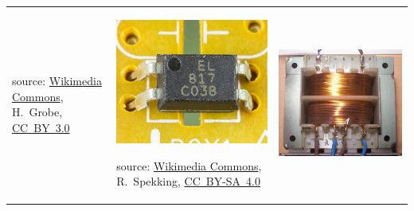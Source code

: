 \begin{frame}
\begin{table}
\begin{tabular}{M{0.3\textwidth} M{0.3\textwidth} M{0.3\textwidth}}
            {\small source: \href{https://commons.wikimedia.org/wiki/File:Plattenkondensator_hg.jpg}{Wikimedia Commons}, H.~Grobe, \href{https://creativecommons.org/licenses/by/3.0/deed.en}{CC~BY~3.0}}

            &

            \includegraphics[height=0.25\textheight]{fig/lec03/Optocoupler_example.jpg}

            {\small source: \href{https://en.wikipedia.org/wiki/File:Philips_BDP3280-12_-_Everlight_EL817_on_power_board-1779.jpg}{Wikimedia Commons}, R.~Spekking, \href{https://creativecommons.org/licenses/by-sa/4.0/deed.en}{CC~BY-SA~4.0}}

            &
            \includegraphics[height=0.25\textheight]{fig/lec03/Transformer_example.jpg}


\end{tabular}
\end{table}
\end{frame}
